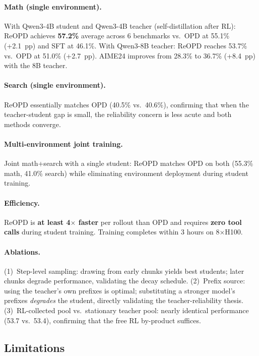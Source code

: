 \documentclass[11pt,a4paper]{article}
\begin{document}
\paragraph{Math (single environment).}
With Qwen3-4B student and Qwen3-4B teacher (self-distillation after RL): ReOPD achieves \textbf{57.2\%} average across 6 benchmarks vs.\ OPD at 55.1\% (+2.1~pp) and SFT at 46.1\%. With Qwen3-8B teacher: ReOPD reaches 53.7\% vs.\ OPD at 51.0\% (+2.7~pp). AIME24 improves from 28.3\% to 36.7\% (+8.4~pp) with the 8B teacher.

\paragraph{Search (single environment).}
ReOPD essentially matches OPD (40.5\% vs.\ 40.6\%), confirming that when the teacher-student gap is small, the reliability concern is less acute and both methods converge.

\paragraph{Multi-environment joint training.}
Joint math+search with a single student: ReOPD matches OPD on both (55.3\% math, 41.0\% search) while eliminating environment deployment during student training.

\paragraph{Efficiency.}
ReOPD is \textbf{at least 4$\times$ faster} per rollout than OPD and requires \textbf{zero tool calls} during student training. Training completes within 3 hours on 8$\times$H100.

\paragraph{Ablations.}
(1)~Step-level sampling: drawing from early chunks yields best students; later chunks degrade performance, validating the decay schedule. (2)~Prefix source: using the teacher's own prefixes is optimal; substituting a stronger model's prefixes \emph{degrades} the student, directly validating the teacher-reliability thesis. (3)~RL-collected pool vs.\ stationary teacher pool: nearly identical performance (53.7 vs.\ 53.4), confirming that the free RL by-product suffices.

\subsection{Limitations}
\end{document}
